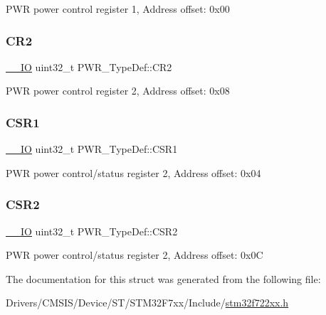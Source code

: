 P\+WR power control register 1, Address offset\+: 0x00 \mbox{\label{struct_p_w_r___type_def_a8426bae04fc4cae7425f07c50f2359ec}} 
\subsubsection{\texorpdfstring{CR2}{CR2}}
{\footnotesize\ttfamily \mbox{\hyperlink{core__sc300_8h_aec43007d9998a0a0e01faede4133d6be}{\+\_\+\+\_\+\+IO}} uint32\+\_\+t P\+W\+R\+\_\+\+Type\+Def\+::\+C\+R2}

P\+WR power control register 2, Address offset\+: 0x08 \mbox{\label{struct_p_w_r___type_def_a682b6c3f4af70d7faf280b2e65b3d4a4}} 
\subsubsection{\texorpdfstring{CSR1}{CSR1}}
{\footnotesize\ttfamily \mbox{\hyperlink{core__sc300_8h_aec43007d9998a0a0e01faede4133d6be}{\+\_\+\+\_\+\+IO}} uint32\+\_\+t P\+W\+R\+\_\+\+Type\+Def\+::\+C\+S\+R1}

P\+WR power control/status register 2, Address offset\+: 0x04 \mbox{\label{struct_p_w_r___type_def_a714467a50d4e50d65d5a900ff87ba058}} 
\subsubsection{\texorpdfstring{CSR2}{CSR2}}
{\footnotesize\ttfamily \mbox{\hyperlink{core__sc300_8h_aec43007d9998a0a0e01faede4133d6be}{\+\_\+\+\_\+\+IO}} uint32\+\_\+t P\+W\+R\+\_\+\+Type\+Def\+::\+C\+S\+R2}

P\+WR power control/status register 2, Address offset\+: 0x0C 

The documentation for this struct was generated from the following file\+:\begin{DoxyCompactItemize}
\item 
Drivers/\+C\+M\+S\+I\+S/\+Device/\+S\+T/\+S\+T\+M32\+F7xx/\+Include/\mbox{\hyperlink{stm32f722xx_8h}{stm32f722xx.\+h}}\end{DoxyCompactItemize}
